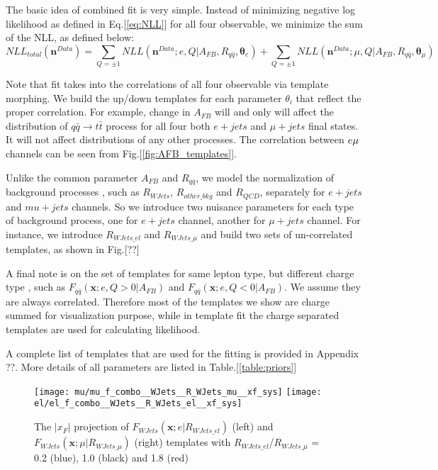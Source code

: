 \documentclass{cmspaperpdf}
\begin{document}
The basic idea of combined fit is very simple. Instead of minimizing negative log likelihood as defined in Eq.[\ref{eq:NLL}] for all four observable, we minimize the sum of the NLL, as defined below:
\begin{equation}
NLL_{total} (\bm n^{Data}) = \sum_{Q=\pm 1} NLL(\bm n^{Data};e, Q |A_{FB},R_{q\bar{q}},\bm \theta_{e}) +  \sum_{Q=\pm 1} NLL(\bm n^{Data};\mu, Q |A_{FB},R_{q\bar{q}},\bm \theta_{\mu})
\end{equation}

Note that fit takes into the correlations of all four observable via template morphing. We build the up/down templates for each parameter $\theta_i$ that reflect the proper correlation. For example, change in $A_{FB}$ will and only will affect the distribution of $q\bar{q}\rightarrow t\bar{t}$ process for all four both $e+jets$ and $\mu + jets$ final states. It will not affect distributions of any other processes. The correlation between $e\/\mu$ channels can be seen from Fig.[\ref{fig:AFB_templates}].

Unlike the common parameter $A_{FB}$ and $R_{q\bar{q}}$, we model the normalization of background processes , such as $R_{WJets}$, $R_{other\_bkg}$ and $R_{QCD}$, separately for $e+jets$ and $mu+jets$ channels. So we introduce two nuisance parameters for each type of background process, one for $e+jets$ channel, another for $\mu+jets$ channel. For instance, we introduce $R_{WJets\_el}$ and $R_{WJets\_\mu}$ and build two sets of un-correlated templates, as shown in Fig.[??]

A final note is on the set of templates for same lepton type, but different charge type , such as $F_{q\bar{q}}(\bm x;e,Q>0|A_{FB})$ and $F_{q\bar{q}}(\bm x;e,Q<0|A_{FB})$. We assume they are always correlated. Therefore most of the templates we show are charge summed for visualization purpose, while in template fit the charge separated templates are used for calculating likelihood.

A complete list of templates that are used for the fitting is provided in Appendix ??. More details of all parameters are listed in Table.[\ref{table:priors}]

\begin{figure}[hbt]
  \begin{center}
    \texttt{[image: mu/mu\_f\_combo\_\_WJets\_\_R\_WJets\_mu\_\_xf\_sys]}
    \texttt{[image: el/el\_f\_combo\_\_WJets\_\_R\_WJets\_el\_\_xf\_sys]}

  \caption{\small The $|x_F|$ projection of $F_{WJets}(\bm x;e|R_{WJets\_el})$ (left) and $F_{WJets}(\bm x;\mu|R_{WJets\_\mu})$ (right) templates with $R_{WJets\_el}$/$R_{WJets\_\mu}$ = 0.2 (blue), 1.0 (black) and 1.8 (red)}
    \label{fig:gg_SF_bkg_templates}
  \end{center}
\end{figure}
\end{document}

